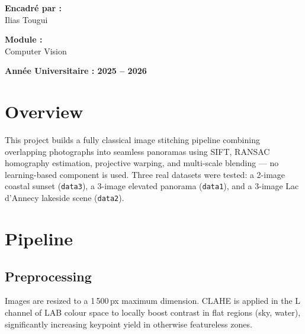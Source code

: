\documentclass[11pt,a4paper]{article}
\begin{document}
\begin{titlepage}
    \vspace{1cm}
    
    \begin{minipage}{0.45\textwidth}
        \begin{flushleft}
            \textbf{Encadré par :}\\
            Ilias Tougui
        \end{flushleft}
    \end{minipage}
    \hfill
    \begin{minipage}{0.45\textwidth}
        \begin{flushright}
            \textbf{Module :}\\
            Computer Vision
        \end{flushright}
    \end{minipage}
    
    \vfill
    {\large\textbf{Année Universitaire : 2025 -- 2026}}
\end{titlepage}


\newpage

\section{Overview}

This project builds a fully classical image stitching pipeline combining overlapping photographs into seamless panoramas using SIFT, RANSAC homography estimation, projective warping, and multi-scale blending — no learning-based component is used. Three real datasets were tested: a 2-image coastal sunset (\texttt{data3}), a 3-image elevated panorama (\texttt{data1}), and a 3-image Lac d'Annecy lakeside scene (\texttt{data2}).

\section{Pipeline}

\subsection{Preprocessing}
Images are resized to a 1\,500\,px maximum dimension. CLAHE is applied in the L channel of LAB colour space to locally boost contrast in flat regions (sky, water), significantly increasing keypoint yield in otherwise featureless zones.
\end{document}
